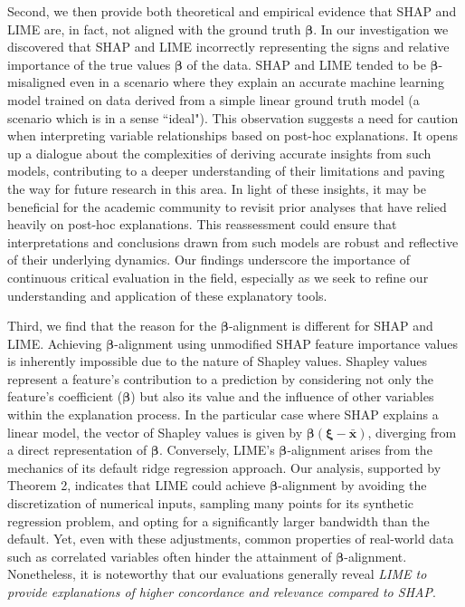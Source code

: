 \documentclass[mnsc,blindrev]{informs3}
\begin{document}
        
       Second, we then provide both theoretical and empirical evidence that SHAP and LIME are, in fact, not aligned with the ground truth $\boldsymbol{\beta}$. In our investigation we discovered that SHAP and LIME incorrectly representing the signs and relative importance of the true values $\boldsymbol{\beta}$ of the data. SHAP and LIME tended to be $\boldsymbol{\beta}$-misaligned even in a scenario where they explain an accurate machine learning model trained on data derived from a simple linear ground truth model (a scenario which is in a sense ``ideal"). This observation suggests a need for caution when interpreting variable relationships based on post-hoc explanations. It opens up a dialogue about the complexities of deriving accurate insights from such models, contributing to a deeper understanding of their limitations and paving the way for future research in this area. In light of these insights, it may be beneficial for the academic community to revisit prior analyses that have relied heavily on post-hoc explanations. This reassessment could ensure that interpretations and conclusions drawn from such models are robust and reflective of their underlying dynamics. Our findings underscore the importance of continuous critical evaluation in the field, especially as we seek to refine our understanding and application of these explanatory tools. %
        
        Third, we find that the reason for the $\boldsymbol{\beta}$-alignment is different for SHAP and LIME. Achieving $\boldsymbol{\beta}$-alignment using unmodified SHAP feature importance values is inherently impossible due to the nature of Shapley values. Shapley values represent a feature's contribution to a prediction by considering not only the feature's coefficient ($\boldsymbol{\beta}$) but also its value and the influence of other variables within the explanation process. In the particular case where SHAP explains a linear model, the vector of Shapley values is given by $\boldsymbol{\beta}(\boldsymbol{\xi}-\bar{\mathbf{x}})$, diverging from a direct representation of $\boldsymbol{\beta}$. Conversely, LIME's $\boldsymbol{\beta}$-alignment arises from the mechanics of its default ridge regression approach. Our analysis, supported by Theorem 2, indicates that LIME could achieve $\boldsymbol{\beta}$-alignment by avoiding the discretization of numerical inputs, sampling many points for its synthetic regression problem, and opting for a significantly larger bandwidth than the default. Yet, even with these adjustments, common properties of real-world data such as correlated variables often hinder the attainment of $\boldsymbol{\beta}$-alignment. Nonetheless, it is noteworthy that our evaluations generally reveal \textit{LIME to provide explanations of higher concordance and relevance compared to SHAP}.
 
\end{document}
